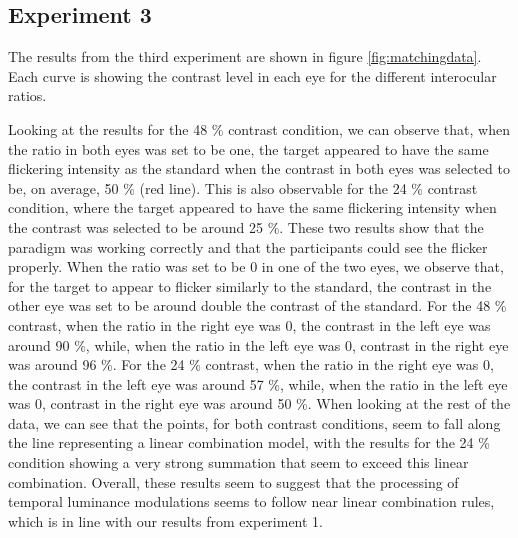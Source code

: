 \documentclass[
]{article}
\begin{document}
\hypertarget{experiment-3-1}{%
\subsection{Experiment 3}\label{experiment-3-1}}

The results from the third experiment are shown in figure \ref{fig:matchingdata}. Each curve is showing the contrast level in each eye for the different interocular ratios.

Looking at the results for the 48 \% contrast condition, we can observe that, when the ratio in both eyes was set to be one, the target appeared to have the same flickering intensity as the standard when the contrast in both eyes was selected to be, on average, 50 \% (red line). This is also observable for the 24 \% contrast condition, where the target appeared to have the same flickering intensity when the contrast was selected to be around 25 \%. These two results show that the paradigm was working correctly and that the participants could see the flicker properly.
When the ratio was set to be 0 in one of the two eyes, we observe that, for the target to appear to flicker similarly to the standard, the contrast in the other eye was set to be around double the contrast of the standard. For the 48 \% contrast, when the ratio in the right eye was 0, the contrast in the left eye was around 90 \%, while, when the ratio in the left eye was 0, contrast in the right eye was around 96 \%. For the 24 \% contrast, when the ratio in the right eye was 0, the contrast in the left eye was around 57 \%, while, when the ratio in the left eye was 0, contrast in the right eye was around 50 \%. When looking at the rest of the data, we can see that the points, for both contrast conditions, seem to fall along the line representing a linear combination model, with the results for the 24 \% condition showing a very strong summation that seem to exceed this linear combination. Overall, these results seem to suggest that the processing of temporal luminance modulations seems to follow near linear combination rules, which is in line with our results from experiment 1.
\end{document}
